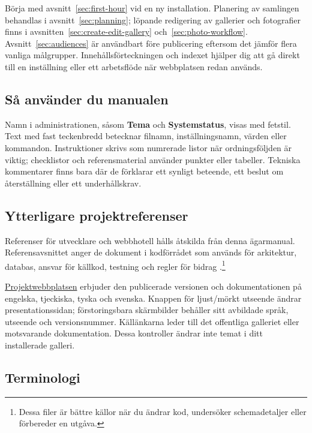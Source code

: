\documentclass[11pt,a4paper]{article}
\newcommand{\ui}[1]{\textbf{#1}}
\begin{document}
Börja med avsnitt~\ref{sec:first-hour} vid en ny installation. Planering av
samlingen behandlas i avsnitt~\ref{sec:planning}; löpande redigering av
gallerier och fotografier finns i avsnitten~\ref{sec:create-edit-gallery}
och~\ref{sec:photo-workflow}. Avsnitt~\ref{sec:audiences} är användbart före
publicering eftersom det jämför flera vanliga målgrupper. Innehållsförteckningen
och indexet hjälper dig att gå direkt till en inställning eller ett arbetsflöde
när webbplatsen redan används.

\subsection{Så använder du manualen}

Namn i administrationen, såsom \ui{Tema} och \ui{Systemstatus}, visas med
fetstil. Text med fast teckenbredd betecknar filnamn, inställningsnamn, värden
eller kommandon. Instruktioner skrivs som numrerade listor när ordningsföljden
är viktig; checklistor och referensmaterial använder punkter eller tabeller.
Tekniska kommentarer finns bara där de förklarar ett synligt beteende, ett
beslut om återställning eller ett underhållskrav.

\subsection{Ytterligare projektreferenser}

Referenser för utvecklare och webbhotell hålls åtskilda från denna ägarmanual.
Referensavsnittet anger de dokument i kodförrådet som används för arkitektur,
databas, ansvar för källkod, testning och regler för bidrag
\cite{readme,architecture,database,codemap,testing,agents}.\footnote{Dessa filer
är bättre källor när du ändrar kod, undersöker schemadetaljer eller förbereder
en utgåva.}

\href{https://phpgallery.site/}{Projektwebbplatsen} erbjuder
den publicerade versionen och dokumentationen på engelska, tjeckiska,
tyska och svenska. Knappen för ljust/mörkt utseende ändrar presentationssidan;
förstoringsbara skärmbilder behåller sitt avbildade språk, utseende och
versionsnummer. Källänkarna leder till det offentliga galleriet eller
motsvarande dokumentation. Dessa kontroller ändrar inte temat i ditt
installerade galleri.

\subsection{Terminologi}
\end{document}
